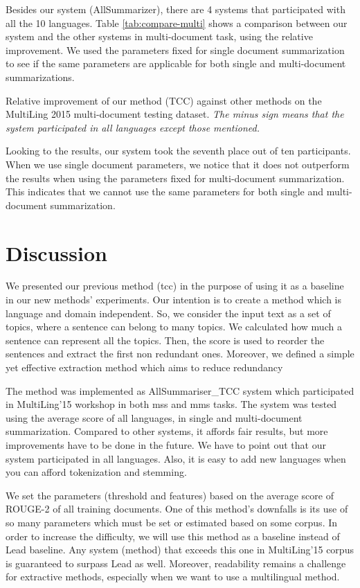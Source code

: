 Besides our system (AllSummarizer), there are 4 systems that participated with all the 10 languages. 
Table \ref{tab:compare-multi} shows a comparison between our system and the other systems in multi-document task, using the relative improvement.
We used the parameters fixed for single document summarization to see if the same parameters are applicable for both single and multi-document summarizations.
%
\begin{table*}[!ht]
	\centering
	\caption[Relative improvement of TCC against other methods on the MultiLing'15 MMS task.]{Relative improvement of our method (TCC) against other methods on the MultiLing 2015 multi-document testing dataset. \textit{The minus sign means that the system participated in all languages except those mentioned.}}
	\label{tab:compare-multi}
\end{table*}

Looking to the results, our system took the seventh place out of ten participants. 
When we use single document parameters, we notice that it does not outperform the results when using the parameters fixed for multi-document summarization.
This indicates that we cannot use the same parameters for both single and multi-document summarization. 

\section{Discussion}

We presented our previous method (\ac{tcc}) \citep{13-aries-al} in the purpose of using it as a baseline in our new methods' experiments. 
Our intention is to create a method which is language and domain independent.
So, we consider the input text as a set of topics, where a sentence can belong to many topics.
We calculated how much a sentence can represent all the topics. 
Then, the score is used to reorder the sentences and extract the first non redundant ones.
Moreover, we defined a simple yet effective extraction method which aims to reduce redundancy 

The method was implemented as AllSummariser\_TCC system which participated in MultiLing'15 workshop in both \acf{mss} and \acf{mms} tasks.
The system was tested using the average score of all languages, in single and multi-document summarization. 
Compared to other systems, it affords fair results, but more improvements have to be done in the future.
We have to point out that our system participated in all languages.
Also, it is easy to add new languages when you can afford tokenization and stemming.

We set the parameters (threshold and features) based on the average score of ROUGE-2 of all training documents.
One of this method's downfalls is its use of so many parameters which must be set or estimated based on some corpus.
In order to increase the difficulty, we will use this method as a baseline instead of Lead baseline. 
Any system (method) that exceeds this one in MultiLing'15 corpus is guaranteed to surpass Lead as well.
Moreover, readability remains a challenge for extractive methods, especially when we want to use a multilingual method.


